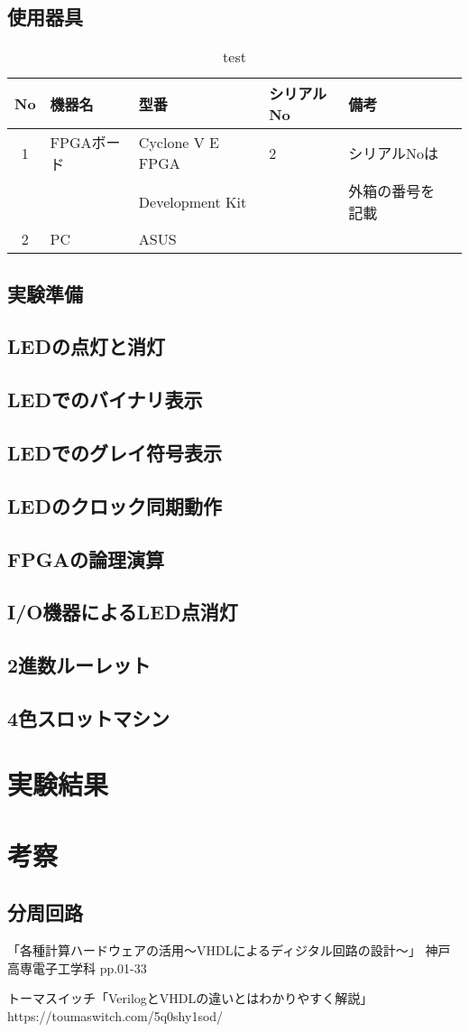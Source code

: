 \documentclass{ltjsarticle}
\begin{document}
	\subsection{使用器具}
		\begin{table}[H]
		\centering
		\caption{test}
		\label{tab:used}
		\begin{tabular}{clllll} \toprule
		No&\multicolumn{1}{l}{機器名}&\multicolumn{1}{l}{型番}&\multicolumn{1}{l}{シリアルNo}&\multicolumn{1}{l}{備考}\\ \hline
		1&FPGAボード&Cyclone V E FPGA&2&シリアルNoは\\
		&&Development Kit&&外箱の番号を記載\\
		2&PC&ASUS &&\\
		\end{tabular}
		\end{table}
	\subsection{実験準備}
	\subsection{LEDの点灯と消灯}
	\subsection{LEDでのバイナリ表示}
	\subsection{LEDでのグレイ符号表示}
	\subsection{LEDのクロック同期動作}
	\subsection{FPGAの論理演算}
	\subsection{I/O機器によるLED点消灯}
	\subsection{2進数ルーレット}
	\subsection{4色スロットマシン}
\section{実験結果}
\section{考察}
	\subsection{分周回路}
\begin{thebibliography}{99}
「各種計算ハードウェアの活用～VHDLによるディジタル回路の設計～」
神戸高専電子工学科 pp.01-33

トーマスイッチ「VerilogとVHDLの違いとはわかりやすく解説」
https://toumaswitch.com/5q0shy1sod/
\end{thebibliography}
\end{document}
